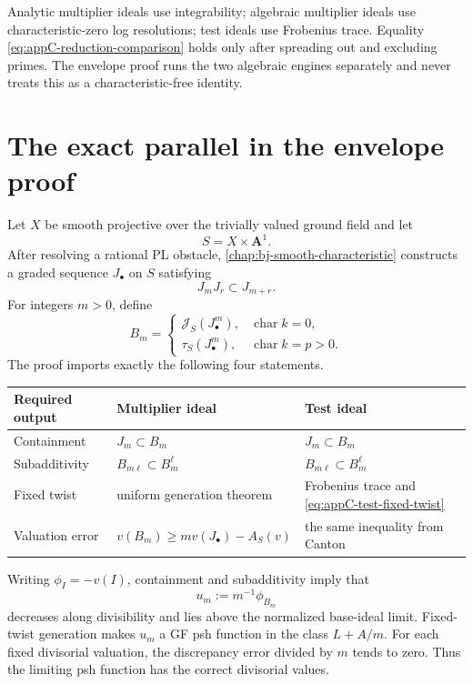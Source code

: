 \begin{remark}
\label{check:appC-characteristic-firewall}
Analytic multiplier ideals use integrability; algebraic multiplier ideals
use characteristic-zero log resolutions; test ideals use Frobenius trace.
Equality \eqref{eq:appC-reduction-comparison} holds only after spreading
out and excluding primes.  The envelope proof runs the two algebraic
engines separately and never treats this as a characteristic-free identity.
\end{remark}

\section{The exact parallel in the envelope proof}
\label{sec:appC-envelope-parallel}

Let \(X\) be smooth projective over the trivially valued ground field and
let
\[
 S=X\times\mathbf A^1.
\]
After resolving a rational PL obstacle, \cref{chap:bj-smooth-characteristic} constructs a graded
sequence \(J_\bullet\) on \(S\) satisfying
\[
 J_mJ_r\subset J_{m+r}.
\tag{C.28}\label{eq:appC-envelope-graded-sequence}
\]
For integers \(m>0\), define
\[
 B_m=
 \begin{cases}
 \mathcal J_S(J_\bullet^m),
      &\operatorname{char}k=0,\\
 \tau_S(J_\bullet^m),
      &\operatorname{char}k=p>0.
 \end{cases}
\tag{C.29}\label{eq:appC-envelope-two-engines}
\]
The proof imports exactly the following four statements.

\begin{center}
\begin{tabular}{p{}p{}p{}}
\toprule
Required output & Multiplier ideal & Test ideal\\
\midrule
Containment
 & \(J_m\subset B_m\)
 & \(J_m\subset B_m\)\\
Subadditivity
 & \(B_{m\ell}\subset B_m^\ell\)
 & \(B_{m\ell}\subset B_m^\ell\)\\
Fixed twist
 & uniform generation theorem
 & Frobenius trace and
   \eqref{eq:appC-test-fixed-twist}\\
Valuation error
 & \(v(B_m)\geq m v(J_\bullet)-A_S(v)\)
 & the same inequality from Canton\\
\bottomrule
\end{tabular}
\end{center}

Writing \(\phi_I=-v(I)\), containment and subadditivity imply that
\[
 u_m:=m^{-1}\phi_{B_m}
\tag{C.30}\label{eq:appC-envelope-stages}
\]
decreases along divisibility and lies above the normalized base-ideal
limit.  Fixed-twist generation makes \(u_m\) a GF psh function in the
class \(L+A/m\).  For each fixed divisorial valuation, the discrepancy
error divided by \(m\) tends to zero.  Thus the limiting psh function has
the correct divisorial values.

